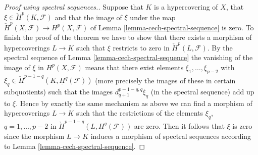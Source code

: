 \begin{proof}[Proof using spectral sequences.]
\medskip\noindent
Suppose that $K$ is a hypercovering of $X$, that
$\xi \in \check{H}^p(K, \mathcal{F})$ and that the image of
$\xi$ under the map
$\check{H}^p(X, \mathcal{F}) \to H^p(X, \mathcal{F})$ of
Lemma \ref{lemma-cech-spectral-sequence}
is zero. To finish the proof of the theorem we have to show that
there exists a morphism of hypercoverings $L \to K$ such that
$\xi$ restricts to zero in $\check{H}^p(L, \mathcal{F})$.
By the spectral sequence of Lemma \ref{lemma-cech-spectral-sequence}
the vanishing of the image of $\xi$ in $H^p(X, \mathcal{F})$
means that there exist elements $\xi_1, \ldots, \xi_{p - 2}$
with $\xi_q \in \check{H}^{p - 1 - q}(K, \underline{H}^q(\mathcal{F}))$
(more precisely the images of these in certain subquotients)
such that the images $d_{q + 1}^{p - 1 - q, q}\xi_q$ (in the spectral
sequence) add up to $\xi$. Hence by exactly the same mechanism as above
we can find a morphism of hypercoverings $L \to K$ such that
the restrictions of the elements $\xi_q$, $q = 1, \ldots, p - 2$
in $\check{H}^{p - 1 - q}(L, \underline{H}^q(\mathcal{F}))$ are zero.
Then it follows that $\xi$ is zero since the morphism $L \to K$
induces a morphism of spectral sequences according to
Lemma \ref{lemma-cech-spectral-sequence}.
\end{proof}


